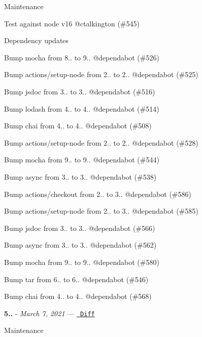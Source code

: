 Maintenance


\begin{DoxyItemize}
\item Test against node v16 @ctalkington (\#545)
\end{DoxyItemize}

Dependency updates


\begin{DoxyItemize}
\item Bump mocha from 8.. to 9.. @dependabot (\#526)
\item Bump actions/setup-\/node from 2.. to 2.. @dependabot (\#525)
\item Bump jsdoc from 3.. to 3.. @dependabot (\#516)
\item Bump lodash from 4.. to 4.. @dependabot (\#514)
\item Bump chai from 4.. to 4.. @dependabot (\#508)
\item Bump actions/setup-\/node from 2.. to 2.. @dependabot (\#528)
\item Bump mocha from 9.. to 9.. @dependabot (\#544)
\item Bump async from 3.. to 3.. @dependabot (\#538)
\item Bump actions/checkout from 2.. to 3.. @dependabot (\#586)
\item Bump actions/setup-\/node from 2.. to 3.. @dependabot (\#585)
\item Bump jsdoc from 3.. to 3.. @dependabot (\#566)
\item Bump async from 3.. to 3.. @dependabot (\#562)
\item Bump mocha from 9.. to 9.. @dependabot (\#580)
\item Bump tar from 6.. to 6.. @dependabot (\#546)
\item Bump chai from 4.. to 4.. @dependabot (\#568)
\end{DoxyItemize}

{\bfseries{5..}} -\/ 
\footnotesize {\itshape March 7, 2021}
\normalsize  — \href{https://github.com/archiverjs/node-archiver/compare/5.2.0...5.3.0}{\texttt{ Diff}}

Maintenance


